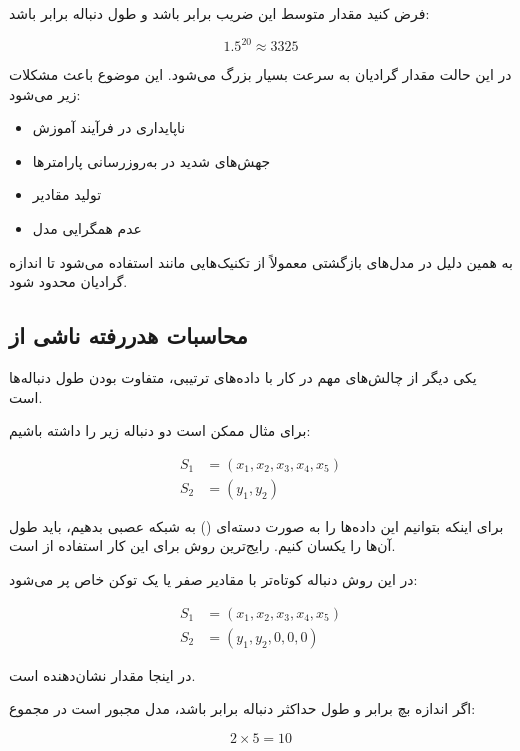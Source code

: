 \documentclass{article}
\begin{document}
فرض کنید مقدار متوسط این ضریب برابر  باشد و طول دنباله برابر  باشد:

\begin{equation}
	1.5^{20} \approx 3325
\end{equation}

در این حالت مقدار گرادیان به سرعت بسیار بزرگ می‌شود. 
این موضوع باعث مشکلات زیر می‌شود:

\begin{itemize}
	\item ناپایداری در فرآیند آموزش
	\item جهش‌های شدید در به‌روزرسانی پارامترها
	\item تولید مقادیر 
	\item عدم همگرایی مدل
\end{itemize}

به همین دلیل در مدل‌های بازگشتی معمولاً از تکنیک‌هایی مانند  استفاده می‌شود تا اندازه گرادیان محدود شود.

\subsection{محاسبات هدررفته ناشی از }

یکی دیگر از چالش‌های مهم در کار با داده‌های ترتیبی، متفاوت بودن طول دنباله‌ها است.

برای مثال ممکن است دو دنباله زیر را داشته باشیم:

\begin{align}
	S_1 &= (x_1, x_2, x_3, x_4, x_5) \\
	S_2 &= (y_1, y_2)
\end{align}

برای اینکه بتوانیم این داده‌ها را به صورت دسته‌ای () به شبکه عصبی بدهیم، باید طول آن‌ها را یکسان کنیم. 
رایج‌ترین روش برای این کار استفاده از  است.

در این روش دنباله کوتاه‌تر با مقادیر صفر یا یک توکن خاص پر می‌شود:

\begin{align}
	S_1 &= (x_1, x_2, x_3, x_4, x_5) \\
	S_2 &= (y_1, y_2, 0, 0, 0)
\end{align}

در اینجا مقدار  نشان‌دهنده  است.

اگر اندازه بچ برابر  و طول حداکثر دنباله برابر  باشد، مدل مجبور است در مجموع:

\begin{equation}
	2 \times 5 = 10
\end{equation}
\end{document}
